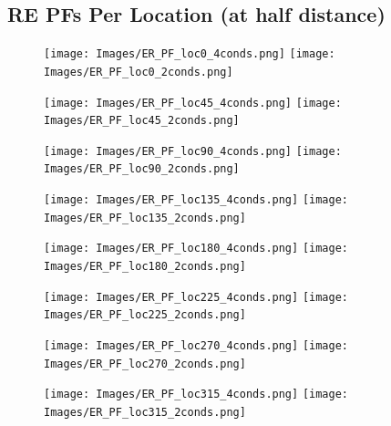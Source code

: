 \documentclass[11pt]{article} %
\begin{document}
\subsection{RE PFs Per Location (at half distance)}
\begin{figure}[H]
\centering %
\texttt{[image: Images/ER\_PF\_loc0\_4conds.png]}
\texttt{[image: Images/ER\_PF\_loc0\_2conds.png]}
\end{figure}
\begin{figure}[H]
\centering %
\texttt{[image: Images/ER\_PF\_loc45\_4conds.png]}
\texttt{[image: Images/ER\_PF\_loc45\_2conds.png]}
\end{figure}
\begin{figure}[H]
\centering %
\texttt{[image: Images/ER\_PF\_loc90\_4conds.png]}
\texttt{[image: Images/ER\_PF\_loc90\_2conds.png]}
\end{figure}
\begin{figure}[H]
\centering %
\texttt{[image: Images/ER\_PF\_loc135\_4conds.png]}
\texttt{[image: Images/ER\_PF\_loc135\_2conds.png]}
\end{figure}
\begin{figure}[H]
\centering %
\texttt{[image: Images/ER\_PF\_loc180\_4conds.png]}
\texttt{[image: Images/ER\_PF\_loc180\_2conds.png]}
\end{figure}
\begin{figure}[H]
\centering %
\texttt{[image: Images/ER\_PF\_loc225\_4conds.png]}
\texttt{[image: Images/ER\_PF\_loc225\_2conds.png]}
\end{figure}
\begin{figure}[H]
\centering %
\texttt{[image: Images/ER\_PF\_loc270\_4conds.png]}
\texttt{[image: Images/ER\_PF\_loc270\_2conds.png]}
\end{figure}
\begin{figure}[H]
\centering %
\texttt{[image: Images/ER\_PF\_loc315\_4conds.png]}
\texttt{[image: Images/ER\_PF\_loc315\_2conds.png]}
\end{figure}

\newpage
\end{document}
